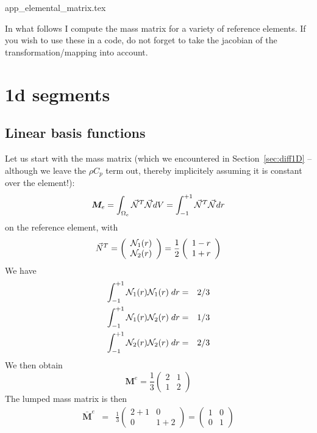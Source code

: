 \begin{flushright} {\tiny {\color{gray} app\_elemental\_matrix.tex}} \end{flushright}

In what follows I compute the mass matrix for a variety of reference elements.
If you wish to use these in a code, do not forget to take the jacobian 
of the transformation/mapping into account. 

\section{1d segments}

\subsection{Linear basis functions}

Let us start with the mass matrix (which we encountered in 
Section~\ref{sec:diff1D} -- although we leave the $\rho C_p$ term out, 
thereby implicitely assuming it is constant over the element!):
\begin{equation}
{\bm M}_e=\int_{\Omega_e} \vec{{\mathcal{N}}}^T \vec{{\mathcal{N}}} dV
= \int_{-1}^{+1} \vec{{\mathcal{N}}}^T \vec{{\mathcal{N}}} dr
\end{equation}
on the reference element, with 
\[
{\vec N}^T = 
\left(
\begin{array}{c}
{\mathcal{N}}_1(r) \\ {\mathcal{N}}_2(r)
\end{array}
\right)
=
\frac{1}{2}
\left(
\begin{array}{c}
1-r \\ 1+r
\end{array}
\right)
\]
We have 
\begin{eqnarray}
\int_{-1}^{+1} {\mathcal{N}}_1(r) {\mathcal{N}}_1(r)\; dr &=& 2/3 \nonumber\\ 
\int_{-1}^{+1} {\mathcal{N}}_1(r) {\mathcal{N}}_2(r)\; dr &=& 1/3 \nonumber\\
\int_{-1}^{+1} {\mathcal{N}}_2(r) {\mathcal{N}}_2(r)\; dr &=& 2/3 \nonumber
\end{eqnarray}
We then obtain 
\[
\boxed{
{\bm M}^e= \frac{1}{3} 
\left(
\begin{array}{cc}
2  & 1 \\
1 & 2
\end{array}
\right)}
\]
The lumped mass matrix is then
\begin{eqnarray}
\bar{\bm M}^e 
&=&
\frac{1}{3}
\left(
\begin{array}{cc}
2+1  & 0 \\
0 & 1+2
\end{array}
\right)
=
\left(
\begin{array}{cc}
1  & 0 \\
0 & 1
\end{array}
\right)
\end{eqnarray}


